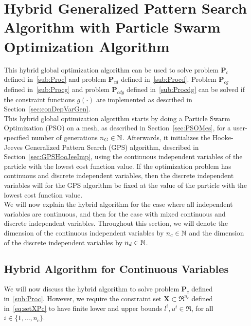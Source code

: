 \section[Hybrid GPS Algorithm with PSO Algorithm]{Hybrid Generalized Pattern Search Algorithm with Particle Swarm Optimization Algorithm}
\label{sec:GPSPSOAlg}
This hybrid global optimization algorithm can be used to solve problem
$\mathbf P_{c}$ defined in~\eqref{sub:Proc} and problem
$\mathbf P_{cd}$ defined in~\eqref{sub:Procd}.
Problem $\mathbf P_{cg}$ defined in~\eqref{sub:Procg} and problem
$\mathbf P_{cdg}$ defined in~\eqref{sub:Procdg} can be solved
if the constraint functions $g(\cdot)$ are implemented as described
in Section~\ref{sec:conDepVarGen}.\\

This hybrid global optimization algorithm starts by doing a Particle Swarm
Optimization (PSO) on a mesh, as described in
Section~\ref{sec:PSOMes}, for a user-specified number of generations $n_G \in {\mathbb N}$.
Afterwards, it initializes the Hooke-Jeeves Generalized Pattern Search (GPS)
algorithm, described in Section~\ref{sec:GPSHooJeeImp}, using
the continuous independent variables of the particle 
with the lowest cost function value.
If the optimization problem has continuous and discrete independent variables, 
then the discrete independent variables will for the GPS algorithm
be fixed at the value of the particle 
with the lowest cost function value.\\

We will now explain the hybrid algorithm for the case where 
all independent variables are continuous,
and then for the case with mixed continuous and discrete 
independent variables.
Throughout this section, we will denote the dimension
of the continuous independent variables by $n_c \in {\mathbb N}$
and the dimension of the discrete independent variables by 
$n_d \in {\mathbb N}$.

\subsection[For Continuous Variables]{Hybrid Algorithm for Continuous Variables}
We will now discuss the hybrid algorithm to solve 
problem $\mathbf P_{c}$ defined in~\eqref{sub:Proc}.
However, we require the constraint set $\mathbf X \subset \Re^{n_c}$ 
defined in~\eqref{eq:setXPc} to have finite lower and upper bounds
$l^i, u^i \in \Re$, for all $i \in \{1, \ldots, n_c\}$.\\


